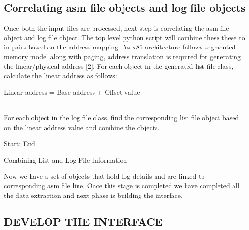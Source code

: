 \subsection {Correlating asm file objects and log file objects}

Once both the input files are processed, next step is correlating the asm file object and log file object. The top level python script will combine these these to in pairs based on the address mapping. As x86 architecture follows segmented memory model along with paging, address translation is required for generating the linear/physical address [2]. For each object in the generated list file class, calculate the linear address as follows:
\\
\centerline{Linear address = Base address + Offset value}
\\
For each object in the log file class, find the corresponding list file object based on the linear address value and combine the objects.


\vspace{1.5cm}

\IncMargin{1em}
\begin{algorithm}[H]
\DontPrintSemicolon
{} 

\BlankLine
Start: \;
End \;
\caption{Combining List and Log File Information}
\end{algorithm}\DecMargin{1em}

\vspace{1.5cm}
Now we have a set of objects that hold log details and are linked to corresponding asm file line. Once this stage is completed we have completed all the data extraction and next phase is building the interface.

\subsection {DEVELOP THE INTERFACE}


